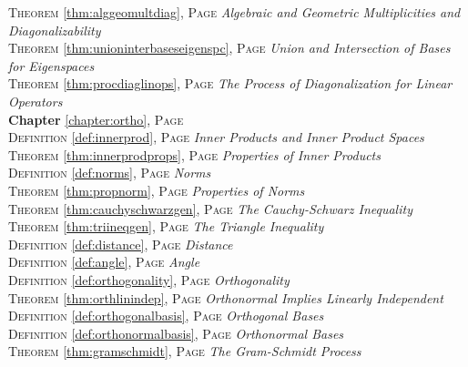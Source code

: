 \begin{multicols}{2}
{\textsc{Theorem} \ref{thm:alggeomultdiag}, \textsc{Page} \pageref{thm:alggeomultdiag} \textit{Algebraic and Geometric Multiplicities and Diagonalizability} \\
\textsc{Theorem} \ref{thm:unioninterbaseseigenspc}, \textsc{Page} \pageref{thm:unioninterbaseseigenspc} \textit{Union and Intersection of Bases for Eigenspaces} \\
\textsc{Theorem} \ref{thm:procdiaglinops}, \textsc{Page} \pageref{thm:procdiaglinops} \textit{The Process of Diagonalization for Linear Operators} \\
\textbf{Chapter} \ref{chapter:ortho}, \textsc{Page} \pageref{chapter:ortho} \\
\textsc{Definition} \ref{def:innerprod}, \textsc{Page} \pageref{def:innerprod} \textit{Inner Products and Inner Product Spaces} \\
\textsc{Theorem} \ref{thm:innerprodprops}, \textsc{Page} \pageref{thm:innerprodprops} \textit{Properties of Inner Products} \\
\textsc{Definition} \ref{def:norms}, \textsc{Page} \pageref{def:norms} \textit{Norms} \\
\textsc{Theorem} \ref{thm:propnorm}, \textsc{Page} \pageref{thm:propnorm} \textit{Properties of Norms} \\
\textsc{Theorem} \ref{thm:cauchyschwarzgen}, \textsc{Page} \pageref{thm:cauchyschwarzgen} \textit{The Cauchy-Schwarz Inequality} \\
\textsc{Theorem} \ref{thm:triineqgen}, \textsc{Page} \pageref{thm:triineqgen} \textit{The Triangle Inequality} \\
\textsc{Definition} \ref{def:distance}, \textsc{Page} \pageref{def:distance} \textit{Distance} \\
\textsc{Definition} \ref{def:angle}, \textsc{Page} \pageref{def:angle} \textit{Angle} \\
\textsc{Definition} \ref{def:orthogonality}, \textsc{Page} \pageref{def:orthogonality} \textit{Orthogonality} \\
\textsc{Theorem} \ref{thm:orthlinindep}, \textsc{Page} \pageref{thm:orthlinindep} \textit{Orthonormal Implies Linearly Independent} \\
\textsc{Definition} \ref{def:orthogonalbasis}, \textsc{Page} \pageref{def:orthogonalbasis} \textit{Orthogonal Bases} \\
\textsc{Definition} \ref{def:orthonormalbasis}, \textsc{Page} \pageref{def:orthonormalbasis} \textit{Orthonormal Bases} \\
\textsc{Theorem} \ref{thm:gramschmidt}, \textsc{Page} \pageref{thm:gramschmidt} \textit{The Gram-Schmidt Process} \\
}
\end{multicols}
